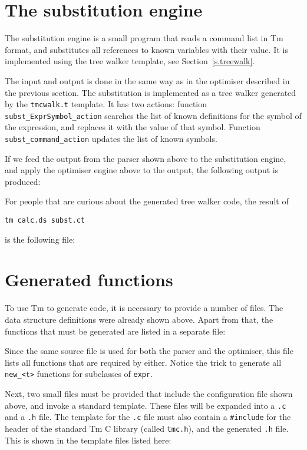 \section{The substitution engine}
The substitution engine is a small program that reads a command list
in Tm format, and substitutes all references to known variables with
their value.
It is implemented using the tree walker template, see Section~\ref{s.treewalk}.
\begin{showfile}

\end{showfile}
The input and output is done in the same way as in the optimiser 
described in the previous section. The substitution is implemented as
a tree walker generated by the \verb'tmcwalk.t' template. It has
two actions: function \verb'subst_ExprSymbol_action' searches the list
of known definitions for the symbol of the expression, and replaces
it with the value of that symbol. Function \verb'subst_command_action'
updates the list of known symbols.
\par
If we feed the output from the parser shown above to the substitution
engine, and apply the optimiser engine above to the output, the following
output is produced:
\begin{showfile}
\end{showfile}
\par
For people that are curious about the generated tree walker code, the
result of
\begin{verbatim}
tm calc.ds subst.ct
\end{verbatim}
is the following file:
\begin{showfile}
\end{showfile}
\section{Generated functions}
To use Tm to generate code, it is necessary to provide a
number of files. The data structure definitions were already shown above.
Apart from that, the functions that must be generated are listed in a
separate file:
\begin{showfile}
\end{showfile}
Since the same source file is used for both the parser and the
optimiser, this file lists all functions that are required by either.
Notice the trick to generate all \verb'new_<t>' functions for subclasses
of \texttt{expr}.

Next, two small files must be provided that include the configuration
file shown above, and invoke a standard template. These files will be
expanded into a \verb'.c' and a \verb'.h' file. The template for the
\verb'.c' file must also contain a \verb'#include' for the header of the
standard Tm C library (called \verb'tmc.h'), and the generated \verb'.h'
file. This is shown in the template files listed here:

